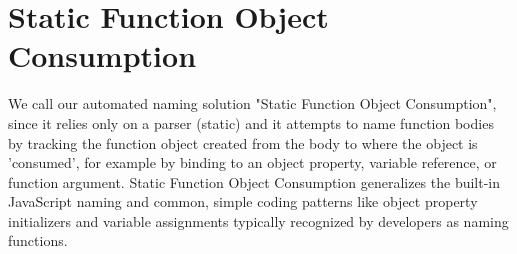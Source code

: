\documentclass[10pt, preprint]{sigplanconf}
\begin{document}
{%

\section{Static  Function Object Consumption}

We call our automated naming solution "Static Function Object Consumption", since it relies only on a parser (static) and it attempts to name function bodies by tracking the function object created from the body to where the object is 'consumed', for example by binding to an object property, variable reference, or function argument.
Static Function Object Consumption generalizes the built-in JavaScript naming and common, simple coding patterns like object property initializers and variable assignments typically recognized by developers as naming functions.

}
\end{document}
